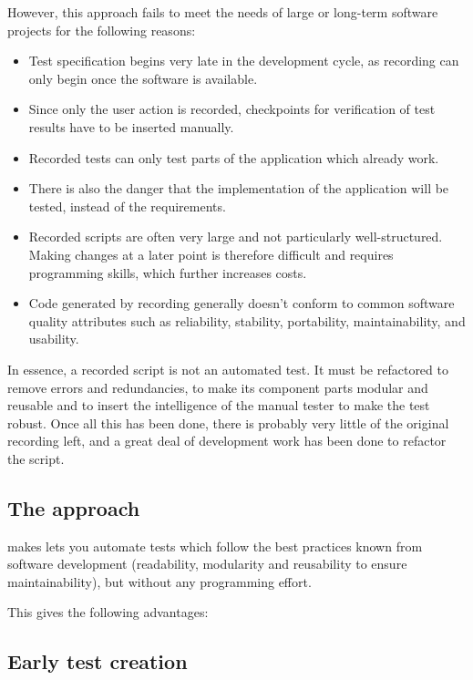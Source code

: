 However, this approach fails to meet the needs of large or long-term software projects for the following reasons:

\begin{itemize}
\item Test specification begins very late in the development cycle,
 as recording can only begin once the software is available. 
\item Since only the user action is recorded, checkpoints for verification
of test results have to be inserted manually.
\item Recorded tests can only test parts of the application which already work. \item There is also the danger that the implementation of the application will be tested, instead of the requirements. 
\item Recorded scripts are often very large and not particularly 
well-structured. Making changes at a later point is therefore 
difficult and requires programming skills, which further increases costs.  
\item Code generated by recording generally doesn't conform to
 common software quality attributes such as reliability, stability, 
portability, maintainability, and usability.
\end{itemize}

In essence, a recorded script is not an automated test. It must be refactored to remove errors and redundancies, to make its component parts modular and reusable and to insert the intelligence of the manual tester to make the test robust. Once all this has been done, there is probably very little of the original recording left, and a great deal of development work has been done to refactor the script.  


\subsection{The \app{} approach}
\label{JBApproach}
\app{} makes lets you automate tests which follow the best practices known from software development (readability, modularity and reusability to ensure maintainability), but without any programming effort. 


This gives the following advantages: 

\subsection{Early test creation}


